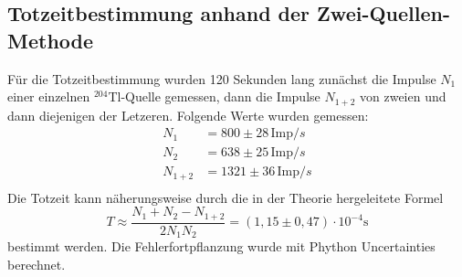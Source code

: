 \subsection{Totzeitbestimmung anhand der Zwei-Quellen-Methode}
  Für die Totzeitbestimmung wurden 120 Sekunden lang zunächst die Impulse $N_1$ einer einzelnen
  $^{204}$Tl-Quelle gemessen, dann die Impulse $N_{1+2}$ von zweien und dann diejenigen der 
  Letzeren. Folgende Werte wurden gemessen:
  \begin{align*}
    N_1     &= 800  \pm 28 \, \text{Imp}/s\\
    N_2     &= 638  \pm 25 \, \text{Imp}/s\\
    N_{1+2} &= 1321 \pm 36 \, \text{Imp}/s\\
  \end{align*}
  Die Totzeit kann näherungsweise durch die in der Theorie hergeleitete Formel 
  \begin{equation*}
  T \approx \dfrac{N_1+N_2-N_{1+2}}{2N_1N_2}= (1,15 \pm 0,47) \cdot 10^{-4} \si{\second}
  \end{equation*}
  bestimmt werden. Die Fehlerfortpflanzung wurde mit Phython Uncertainties berechnet.

